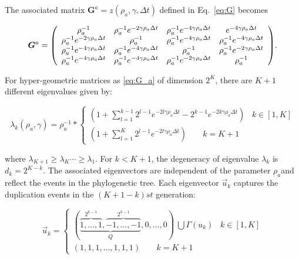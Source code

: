 \documentclass[preprint,amsmath,amssymb,superscriptaddress,showpacs,pre]{revtex4-1}
\let\originalleft\left
\let\originalright\right
\renewcommand{\left}{\mathopen{}\mathclose\bgroup\originalleft}
\renewcommand{\right}{\aftergroup\egroup\originalright}
\begin{document}
The associated matrix $\bm G^a=z(\rho_a,\gamma,\Delta t)$  defined in Eq.~\eqref{eq:G} becomes

\begin{equation} 
\bm G^a =  \left(
\begin{array}{cccc}
{  \rho^{-1}_a } & {\rho^{-1}_a } e ^{-2\gamma\rho_a\Delta t} & {\rho^{-1}_a } e ^{-4\gamma\rho_a\Delta t}& {e ^{-4\gamma\rho_a\Delta t}} \\
{\rho^{-1}_a } e ^{-2\gamma\rho_a\Delta t} & {\rho^{-1}_a } & {\rho^{-1}_a } e ^{-4\gamma\rho_a\Delta t} & {\rho^{-1}_a } e ^{-4\gamma\rho_a\Delta t} \\
{\rho^{-1}_a } e ^{-4\gamma\rho_a\Delta t} & {\rho^{-1}_a} e ^{-4\gamma\rho_a\Delta t}& {\rho^{-1}_a } & {\rho^{-1}_a } e ^{-2\gamma\rho_a\Delta t}\\
{\rho^{-1}_a } e ^{-4\gamma\rho_a\Delta t} & {\rho^{-1}_a } e ^{-4\gamma\rho_a\Delta t} & {\rho^{-1}_a } e ^{-2\gamma\rho_a\Delta t} & {\rho^{-1}_a } \\
\end{array}\label{eq:G_a}
\right).
\end{equation}

For hyper-geometric matrices as \eqref{eq:G_a} of dimension $2^K$, there are $K+1$ different eigenvalues  given by: 

\begin{equation}
\label{eq:lambda_hyper}
\lambda_k(\rho_a,\gamma) =\rho^{-1}_a *
\begin{cases}
 (1+\sum_{l=1}^{k-1} 2^{l-1} e ^{-2l\gamma\rho_a\Delta t}-2^{k-1} e ^{-2k\gamma\rho_a\Delta t})\;\;\; k\in[1,K] \\
 (1+\sum_{l=1}^{K} 2^{l-1} e ^{-2l\gamma\rho_a\Delta t}) \;\;\;\;\;\;\;k=K+1
\end{cases}
\end{equation}

where $\lambda_{K+1}\ge\lambda_{K}\cdots\ge\lambda_{1}$. For $k<K+1$, the degeneracy of eigenvalue $\lambda_k$ is $d_k=2^{K-k}$.  
The associated eigenvectors are independent of the parameter $\rho_a$and reflect the events in the phylogenetic tree.
Each eigenvector $\vec{u}_k$ captures the duplication events in the $(K+1 -k) st$ generation:

\begin{equation} 
\nonumber
 \vec{u}_k =
\begin{cases}
{(\underbrace{\overbrace{1,\ldots,1}^{2^{k-1}},\overbrace{-1,\ldots,-1}^{2^{k-1}}}_Q,0,\ldots,0)\ \bigcup \Gamma(u_k) } \;\;\; k\in[1,K] \\
(1,1,1,\ldots,1,1,1)\;\;\;\;\;\;\;k=K+1
\label{eq:eigenvec_simpler_case}
\end{cases}	
\end{equation}
\end{document}
